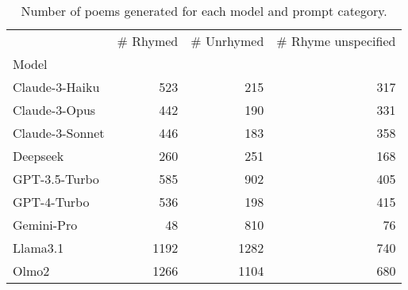 \begin{table}[H]
  \centering
  \small
  \singlespacing
  \begin{tabular}{lrrr}
  \toprule
   & \# Rhymed & \# Unrhymed & \# Rhyme unspecified \\
  Model &  &  &  \\
  \midrule
  Claude-3-Haiku & 523 & 215 & 317 \\
  Claude-3-Opus & 442 & 190 & 331 \\
  Claude-3-Sonnet & 446 & 183 & 358 \\
  Deepseek & 260 & 251 & 168 \\
  GPT-3.5-Turbo & 585 & 902 & 405 \\
  GPT-4-Turbo & 536 & 198 & 415 \\
  Gemini-Pro & 48 & 810 & 76 \\
  Llama3.1 & 1192 & 1282 & 740 \\
  Olmo2 & 1266 & 1104 & 680 \\
  \bottomrule
  \end{tabular}
  \caption{Number of poems generated for each model and prompt category.}
  \label{tab:num_poems_models}
\end{table}
